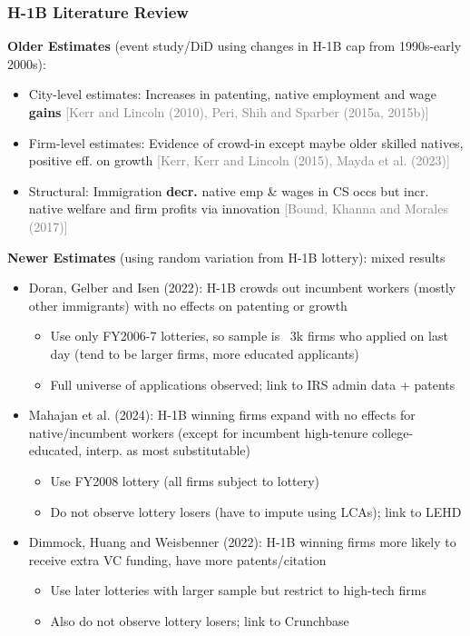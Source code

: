 \documentclass[xcolor=dvipsnames, compress, 12pt, aspectratio=169, handout]{beamer}
\begin{document}
\begin{frame}[allowframebreaks]\label{h1blit}
    \frametitle{H-1B Literature Review \hyperlink{idea2}{}}
    \textbf{Older Estimates} (event study/DiD using changes in H-1B cap from 1990s-early 2000s): 
    \begin{itemize}
        \item City-level estimates: Increases in patenting, native employment and wage \textbf{gains} \textcolor{gray}{[Kerr and Lincoln (2010), Peri, Shih and Sparber (2015a, 2015b)]}
        \item Firm-level estimates: Evidence of crowd-in except maybe older skilled natives, positive eff. on growth \textcolor{gray}{[Kerr, Kerr and Lincoln (2015), Mayda et al. (2023)]}
        \item Structural: Immigration \textbf{decr.} native emp \& wages in CS occs but incr. native welfare and firm profits via innovation \textcolor{gray}{[Bound, Khanna and Morales (2017)]}
    \end{itemize}
    \textbf{Newer Estimates} (using random variation from H-1B lottery): mixed results
    \begin{itemize}
        \item Doran, Gelber and Isen (2022): H-1B crowds out incumbent workers (mostly other immigrants) with no effects on patenting or growth
        \begin{itemize}
            \item Use only FY2006-7 lotteries, so sample is ~3k firms who applied on last day (tend to be larger firms, more educated applicants)
            \item Full universe of applications observed; link to IRS admin data + patents 
        \end{itemize}
        \item Mahajan et al. (2024): H-1B winning firms expand with no effects for native/incumbent workers (except for incumbent high-tenure college-educated, interp. as most substitutable)
        \begin{itemize}
            \item Use FY2008 lottery (all firms subject to lottery)
            \item Do not observe lottery losers (have to impute using LCAs); link to LEHD
        \end{itemize}
        \item Dimmock, Huang and Weisbenner (2022): H-1B winning firms more likely to receive extra VC funding, have more patents/citation
        \begin{itemize}
            \item Use later lotteries with larger sample but restrict to high-tech firms
            \item Also do not observe lottery losers; link to Crunchbase
        \end{itemize}
    \end{itemize}
\end{frame}
\end{document}
